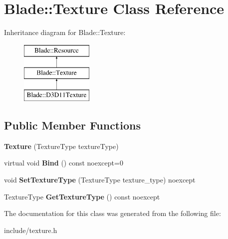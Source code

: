 \hypertarget{class_blade_1_1_texture}{}\section{Blade\+:\+:Texture Class Reference}
\label{class_blade_1_1_texture}
Inheritance diagram for Blade\+:\+:Texture\+:\begin{figure}[H]
\begin{center}
\leavevmode
\includegraphics[height=3.000000cm]{class_blade_1_1_texture}
\end{center}
\end{figure}
\subsection*{Public Member Functions}
\begin{DoxyCompactItemize}
\item 
\mbox{\label{class_blade_1_1_texture_ab037c00d5520adc0e1f8f3b1baa6777c}} 
{\bfseries Texture} (Texture\+Type texture\+Type)
\item 
\mbox{\label{class_blade_1_1_texture_a2728fb4cd8623945f470db0a3ffb0c1a}} 
virtual void {\bfseries Bind} () const noexcept=0
\item 
\mbox{\label{class_blade_1_1_texture_a39c6d588d41c78cfa0cec07554b7b6bd}} 
void {\bfseries Set\+Texture\+Type} (Texture\+Type texture\+\_\+type) noexcept
\item 
\mbox{\label{class_blade_1_1_texture_ad19fe59d6bfecf475b35b12eab9cc703}} 
Texture\+Type {\bfseries Get\+Texture\+Type} () const noexcept
\end{DoxyCompactItemize}


The documentation for this class was generated from the following file\+:\begin{DoxyCompactItemize}
\item 
include/texture.\+h\end{DoxyCompactItemize}
